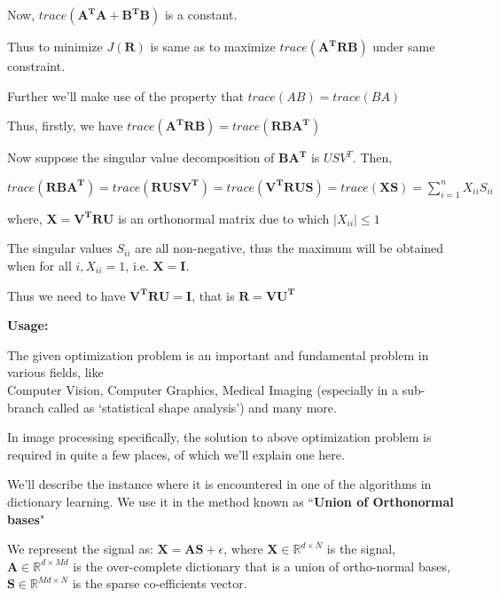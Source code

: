 \documentclass[fleqn, 11pt]{article}
\newcommand{\bs}[1]{\boldsymbol{#1}}
\newcommand{\R}[0]{\mathbb{R}}
\begin{document}
Now, $trace(\bs{A^TA + B^TB})$ is a constant.

Thus to  minimize $J(\bs{R})$ is same as to maximize $trace(\bs{A^TRB})$ under same constraint. 

\medskip 

Further we'll make use of the property that $ trace(AB) = trace(BA) $ 

\smallskip

Thus, firstly, we have $trace(\bs{A^TRB}) = trace(\bs{RBA^T})$

\medskip 

Now suppose the singular value decomposition of $\bs{BA^T}$ is $USV^T$. Then, 
\begin{center}
    $trace(\bs{RBA^T})  =  trace(\bs{RUSV^T}) =  trace(\bs{V^TRUS}) =  trace(\bs{XS}) 
    = \displaystyle \sum_{i=1}^n X_{ii} S_{ii}   $
\end{center}
where, $\bs{X=V^TRU}$ is an orthonormal matrix due to which $|X_{ii}| \leq 1$ 

The singular values $S_{ii}$ are all non-negative, thus the maximum will be obtained when 
for all $i, X_{ii}=1$, i.e. $\bs{X=I}$. 

Thus we need to have $\bs{V^TRU=I}$, that is $\bs{R=VU^T}$


\hrulefill


\newpage 

\textbf{Usage: }

\medskip

The given optimization problem is an important and fundamental problem in various fields, like   \\ 
Computer Vision, Computer Graphics, Medical Imaging (especially in a sub-branch called as `statistical shape analysis') and many more.

\medskip

In image processing specifically, the solution to above optimization problem is required in quite a few places, of which we'll explain one here. 

\medskip 

We'll describe the instance where it is encountered in one of the algorithms in dictionary learning. We use it in the method known as ``\textbf{Union of Orthonormal bases}"

\smallskip

We represent the signal as: $\bs{X}=\bs{AS}+\epsilon$, where $\bs{X} \in \R^{d \times N}$ is the signal, 
$\bs{A} \in \R^{d \times Md} $ is the over-complete dictionary that is a union of ortho-normal
bases,  $\bs{S} \in \R^{Md \times N} $ is 
the sparse co-efficients vector. 
\end{document}
